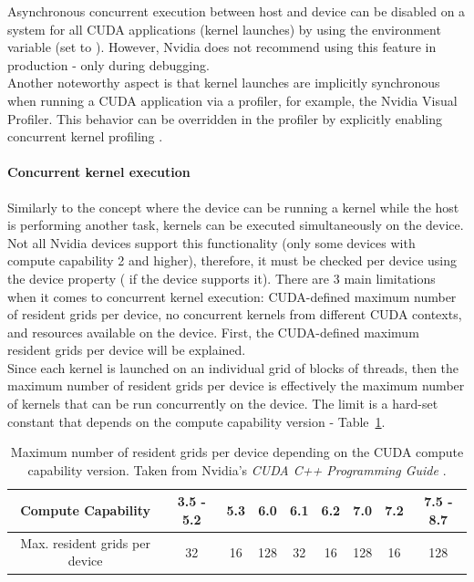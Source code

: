 Asynchronous concurrent execution between host and device can be disabled on a system for all CUDA applications (kernel launches) by using the  environment variable (set to ). However, Nvidia does not recommend using this feature in production - only during debugging. \\
Another noteworthy aspect is that kernel launches are implicitly synchronous when running a CUDA application via a profiler, for example, the Nvidia Visual Profiler. This behavior can be overridden in the profiler by explicitly enabling concurrent kernel profiling \cite{NVIDIAMay2022}.

\paragraph{Concurrent kernel execution}\label{Paragraph:theory-CUDA-asynchronous-concurrent-execution-concurrent-kernel-execution}
Similarly to the concept where the device can be running a kernel while the host is performing another task, kernels can be executed simultaneously on the device. Not all Nvidia devices support this functionality (only some devices with compute capability 2 and higher), therefore, it must be checked per device using the  device property ( if the device supports it). There are 3 main limitations when it comes to concurrent kernel execution: CUDA-defined maximum number of resident grids per device, no concurrent kernels from different CUDA contexts, and resources available on the device. First, the CUDA-defined maximum resident grids per device will be explained. \\
Since each kernel is launched on an individual grid of blocks of threads, then the maximum number of resident grids per device is effectively the maximum number of kernels that can be run concurrently on the device. The limit is a hard-set constant that depends on the compute capability version - Table~\ref{Table:theory-CUDA-maximum-resident-grids-per-device}.

\begin{table}[ht!]
	\centering
	\renewcommand{\arraystretch}{1.5}
	\begin{tabular}{ |c|c|c|c|c|c|c|c|c| } 
		\hline
		Compute Capability & 3.5 - 5.2 & 5.3 & 6.0 & 6.1 & 6.2 & 7.0 & 7.2 & 7.5 - 8.7 \\
		\hline
		Max. resident grids per device & 32 & 16 & 128 & 32 & 16 & 128 & 16 & 128 \\
		\hline
	\end{tabular}
	\caption{Maximum number of resident grids per device depending on the CUDA compute capability version. Taken from Nvidia's \emph{CUDA C++ Programming Guide} \cite{NVIDIAMay2022}.}
	\label{Table:theory-CUDA-maximum-resident-grids-per-device}
\end{table}

